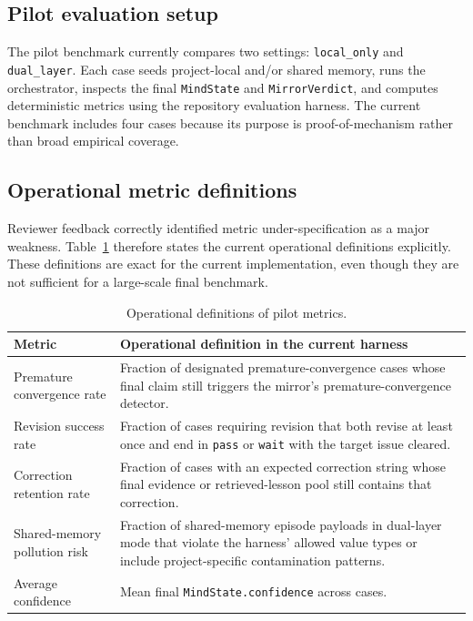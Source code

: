 \documentclass[12pt]{article}
\begin{document}
\subsection{Pilot evaluation setup}

The pilot benchmark currently compares two settings: \texttt{local\_only} and \texttt{dual\_layer}. Each case seeds project-local and/or shared memory, runs the orchestrator, inspects the final \texttt{MindState} and \texttt{MirrorVerdict}, and computes deterministic metrics using the repository evaluation harness. The current benchmark includes four cases because its purpose is proof-of-mechanism rather than broad empirical coverage.

\subsection{Operational metric definitions}

Reviewer feedback correctly identified metric under-specification as a major weakness. Table~\ref{tab:metric-definitions-v3} therefore states the current operational definitions explicitly. These definitions are exact for the current implementation, even though they are not sufficient for a large-scale final benchmark.

\begin{table}[H]
\centering
\begin{tabular}{p{3.4cm}p{9.2cm}}
\toprule
Metric & Operational definition in the current harness \\
\midrule
Premature convergence rate & Fraction of designated premature-convergence cases whose final claim still triggers the mirror's premature-convergence detector. \\
Revision success rate & Fraction of cases requiring revision that both revise at least once and end in \texttt{pass} or \texttt{wait} with the target issue cleared. \\
Correction retention rate & Fraction of cases with an expected correction string whose final evidence or retrieved-lesson pool still contains that correction. \\
Shared-memory pollution risk & Fraction of shared-memory episode payloads in dual-layer mode that violate the harness' allowed value types or include project-specific contamination patterns. \\
Average confidence & Mean final \texttt{MindState.confidence} across cases. \\
\bottomrule
\end{tabular}
\caption{Operational definitions of pilot metrics.}
\label{tab:metric-definitions-v3}
\end{table}
\end{document}
